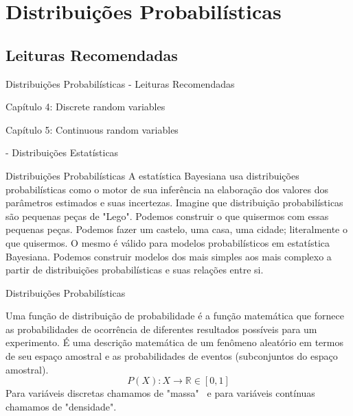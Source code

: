 \section{Distribuições Probabilísticas}

\subsection{Leituras Recomendadas}
\begin{frame}{Distribuições Probabilísticas - Leituras Recomendadas}
    \begin{vfilleditems}
        \item \textcite{dekkingModernIntroductionProbability2010}
        \begin{vfilleditems}
            \item Capítulo 4: Discrete random variables
            \item Capítulo 5: Continuous random variables
        \end{vfilleditems}
        \item \textcite{betancourtProbabilisticBuildingBlocks2019}
        \item \textcite{storopoli2021estatisticabayesianaR} - Distribuições Estatísticas
    \end{vfilleditems}
\end{frame}

\begin{frame}{Distribuições Probabilísticas}
    A estatística Bayesiana usa distribuições probabilísticas como o motor de sua inferência na elaboração dos
    valores dos parâmetros estimados e suas incertezas.
    \vfill
    Imagine que distribuição probabilísticas são pequenas peças de "Lego". Podemos construir o que quisermos com
    essas pequenas peças. Podemos fazer um castelo, uma casa, uma cidade; literalmente o que quisermos. O mesmo é
    válido para modelos probabilísticos em estatística Bayesiana. Podemos construir modelos dos mais simples aos mais
    complexo a partir de distribuições probabilísticas e suas relações entre si.
\end{frame}

\begin{frame}{Distribuições Probabilísticas}
    \begin{defn}
        Uma função de distribuição de probabilidade é a função matemática que fornece as probabilidades de ocorrência
        de diferentes resultados possíveis para um experimento. É uma descrição matemática de um fenômeno
        aleatório em termos de seu espaço amostral e as probabilidades de eventos (subconjuntos do espaço amostral).
        $$P(X): X \to \mathbb{R} \in [0, 1]$$
        Para variáveis discretas chamamos de "massa"~
        e para variáveis contínuas chamamos de "densidade".
    \end{defn}
\end{frame}

